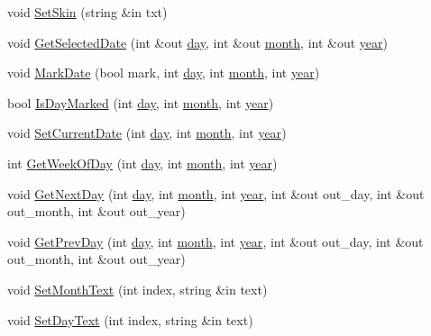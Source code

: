 \begin{DoxyCompactItemize}
\item 
void \hyperlink{class_g_u_i_calendar_a6be34e394f62c81e7e3bd1fb7ccae5c1}{Set\+Skin} (string \&in txt)
\item 
void \hyperlink{class_g_u_i_calendar_a69a4736136a7b89360804cab5c208715}{Get\+Selected\+Date} (int \&out \hyperlink{class_g_u_i_calendar_a1ed661850524a4400fcfd7c1492343e7}{day}, int \&out \hyperlink{class_g_u_i_calendar_a9fdf49f15244c7e0c6d386d33835f4f0}{month}, int \&out \hyperlink{class_g_u_i_calendar_ab3d9a88e28a1f1a509796b554a922233}{year})
\item 
void \hyperlink{class_g_u_i_calendar_a3faf495cbcc49dc23758f3d12ffadf94}{Mark\+Date} (bool mark, int \hyperlink{class_g_u_i_calendar_a1ed661850524a4400fcfd7c1492343e7}{day}, int \hyperlink{class_g_u_i_calendar_a9fdf49f15244c7e0c6d386d33835f4f0}{month}, int \hyperlink{class_g_u_i_calendar_ab3d9a88e28a1f1a509796b554a922233}{year})
\item 
bool \hyperlink{class_g_u_i_calendar_ac2480135211c326cfe09ab164a7fef92}{Is\+Day\+Marked} (int \hyperlink{class_g_u_i_calendar_a1ed661850524a4400fcfd7c1492343e7}{day}, int \hyperlink{class_g_u_i_calendar_a9fdf49f15244c7e0c6d386d33835f4f0}{month}, int \hyperlink{class_g_u_i_calendar_ab3d9a88e28a1f1a509796b554a922233}{year})
\item 
void \hyperlink{class_g_u_i_calendar_a98f98dd6664cddb6933191f29f10fdb0}{Set\+Current\+Date} (int \hyperlink{class_g_u_i_calendar_a1ed661850524a4400fcfd7c1492343e7}{day}, int \hyperlink{class_g_u_i_calendar_a9fdf49f15244c7e0c6d386d33835f4f0}{month}, int \hyperlink{class_g_u_i_calendar_ab3d9a88e28a1f1a509796b554a922233}{year})
\item 
int \hyperlink{class_g_u_i_calendar_a8893125b73ff8ed7dd0ff9835689a141}{Get\+Week\+Of\+Day} (int \hyperlink{class_g_u_i_calendar_a1ed661850524a4400fcfd7c1492343e7}{day}, int \hyperlink{class_g_u_i_calendar_a9fdf49f15244c7e0c6d386d33835f4f0}{month}, int \hyperlink{class_g_u_i_calendar_ab3d9a88e28a1f1a509796b554a922233}{year})
\item 
void \hyperlink{class_g_u_i_calendar_ae8d90fea5e4d9f0fa48c495a810b83dc}{Get\+Next\+Day} (int \hyperlink{class_g_u_i_calendar_a1ed661850524a4400fcfd7c1492343e7}{day}, int \hyperlink{class_g_u_i_calendar_a9fdf49f15244c7e0c6d386d33835f4f0}{month}, int \hyperlink{class_g_u_i_calendar_ab3d9a88e28a1f1a509796b554a922233}{year}, int \&out out\+\_\+day, int \&out out\+\_\+month, int \&out out\+\_\+year)
\item 
void \hyperlink{class_g_u_i_calendar_ab0d6f371e6dbff23d97a9b31e20e5ec2}{Get\+Prev\+Day} (int \hyperlink{class_g_u_i_calendar_a1ed661850524a4400fcfd7c1492343e7}{day}, int \hyperlink{class_g_u_i_calendar_a9fdf49f15244c7e0c6d386d33835f4f0}{month}, int \hyperlink{class_g_u_i_calendar_ab3d9a88e28a1f1a509796b554a922233}{year}, int \&out out\+\_\+day, int \&out out\+\_\+month, int \&out out\+\_\+year)
\item 
void \hyperlink{class_g_u_i_calendar_afb09ad1e0fdcf9adf6cc6f646dca22f1}{Set\+Month\+Text} (int index, string \&in text)
\item 
void \hyperlink{class_g_u_i_calendar_ad141ebe396a0b0a457e939266f09e0be}{Set\+Day\+Text} (int index, string \&in text)
\end{DoxyCompactItemize}

